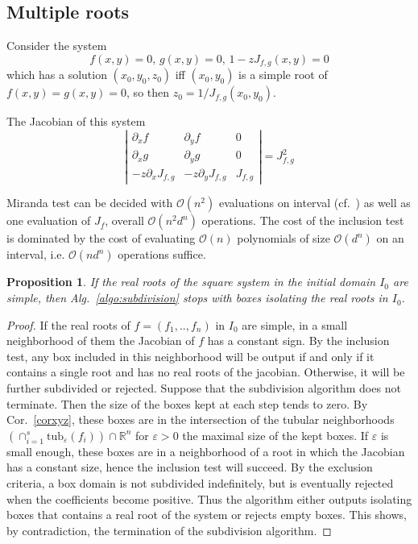 \documentclass{sig-alternate}
\newtheorem{proposition}[theorem]{Proposition}
\newcommand{\dott}{{..}}
\def\RR{\mathbb{R}}
\newcommand{\OO}{\ensuremath{\mathcal{O}}\xspace}
\newcommand{\uvec}[1]{\underline{#1}}
\begin{document}
\subsection{Multiple roots}
Consider the system
$$
f(x,y)=0, \, g(x,y)=0, \, 1- z J_{f,g}(x,y)=0 
$$ which has a solution $(x_0,y_0,z_0)$ iff $(x_0,y_0)$ is a simple
root of $f(x,y)=g(x,y)=0$, so then $z_0=1/J_{f,g}(x_0,y_0)$.

The Jacobian of this system
$$
\left|
\begin{array}{ccc}
\partial_x f          &   \partial_y f      &  0 \\ 
\partial_x g          &   \partial_y g      &  0 \\
 -z \partial_x J_{f,g} &  -z\partial_y J_{f,g} &  J_{f,g} 
\end{array} 
\right| = J_{f,g}^2
$$

\fi
{}  Miranda test can be
decided with $\OO(n^2)$ evaluations on interval (cf.~\cite{Garloff00}) as well
as one evaluation of $J_{\uvec f}$, overall $\OO(n^2d^n)$ operations.  The
cost of the inclusion test is dominated by the cost of evaluating
$\OO(n)$ polynomials of size $\OO(d^n)$ on an interval,
i.e. $\OO(nd^n)$ operations suffice.


\begin{proposition} 
If the real roots of the square system in the initial domain $I_{0}$ are simple, then
Alg.~\ref{algo:subdivision} stops with boxes isolating the
real roots in $I_{0}$.
\end{proposition}
\begin{proof}
  If the real roots of $f=(f_{1}, \dott, f_{n})$ in $I_{0}$ are simple, in a small neighborhood of
  them the Jacobian of $f$ has a constant sign. By the inclusion
  test, any box included in this neighborhood will be output if and
  only if it contains a single root and has no real roots of the
  jacobian. Otherwise, it will be further subdivided or
  rejected. Suppose that the subdivision algorithm does not
  terminate. Then the size of the boxes kept at each step tends to
  zero. By Cor.~\ref{corxyz}, these boxes are in the intersection of
  the tubular neighborhoods $\left( \cap_{i=1}^s
    \text{tub}_\varepsilon (f_i) \right) \cap \RR^n$ for
  $\varepsilon>0$ the maximal size of the kept boxes. If $\varepsilon$
  is small enough, these boxes are in a neighborhood of a root in
  which the Jacobian has a constant size, hence the inclusion test
  will succeed.  By the exclusion criteria, a box domain is not
  subdivided indefinitely, but is eventually rejected when the
  coefficients become positive.  Thus the algorithm either outputs
  isolating boxes that contains a real root of the system or rejects
  empty boxes. This shows, by contradiction, the termination of the
  subdivision algorithm.
\end{proof} 
\end{document}

